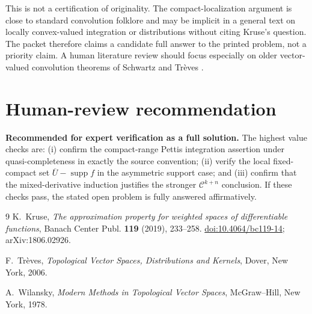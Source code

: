 \documentclass[11pt]{article}
\newcommand{\supp}{\operatorname{supp}}
\newcommand{\C}{\mathcal{C}}
\begin{document}
This is not a certification of originality. The compact-localization argument
is close to standard convolution folklore and may be implicit in a general
text on locally convex-valued integration or distributions without citing
Kruse's question. The packet therefore claims a candidate full answer to the
printed problem, not a priority claim. A human literature review should focus
especially on older vector-valued convolution theorems of Schwartz and
Tr\`eves \cite[Chap.~26]{Treves2006}.

\section{Human-review recommendation}

\textbf{Recommended for expert verification as a full solution.} The highest
value checks are: (i) confirm the compact-range Pettis integration assertion
under quasi-completeness in exactly the source convention; (ii) verify the
local fixed-compact set $\overline U-\supp f$ in the asymmetric support case;
and (iii) confirm that the mixed-derivative induction justifies the stronger
$\C^{k+n}$ conclusion. If these checks pass, the stated open problem is fully
answered affirmatively.

\begin{thebibliography}{9}
K.~Kruse,
\emph{The approximation property for weighted spaces of differentiable
functions}, Banach Center Publ. \textbf{119} (2019), 233--258.
\href{https://doi.org/10.4064/bc119-14}{doi:10.4064/bc119-14};
arXiv:1806.02926.

F.~Tr\`eves,
\emph{Topological Vector Spaces, Distributions and Kernels},
Dover, New York, 2006.

A.~Wilansky,
\emph{Modern Methods in Topological Vector Spaces},
McGraw--Hill, New York, 1978.
\end{thebibliography}
\end{document}
